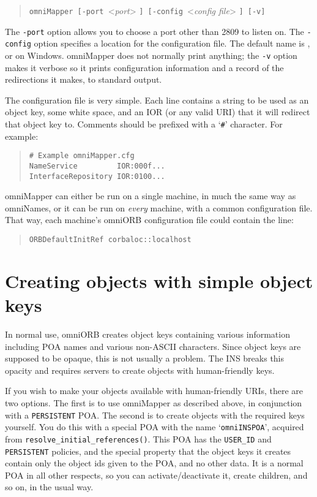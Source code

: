 \documentclass[11pt,oneside,a4paper]{book}
\newcommand{\code}[1]{\texttt{#1}}
\newcommand{\op}[1]{\texttt{#1()}}
\newcommand{\cmdline}[1]{\texttt{#1}}
\begin{document}
\begin{quote}
\cmdline{omniMapper [-port }<\textit{port}>%
\cmdline{] [-config }<\textit{config file}>%
\cmdline{] [-v]}
\end{quote}

\noindent The \cmdline{-port} option allows you to choose a port other
than 2809 to listen on. The \cmdline{-config} option specifies a
location for the configuration file. The default name is
, or  on
Windows. omniMapper does not normally print anything; the \cmdline{-v}
option makes it verbose so it prints configuration information and a
record of the redirections it makes, to standard output.

The configuration file is very simple. Each line contains a string to
be used as an object key, some white space, and an IOR (or any valid
URI) that it will redirect that object key to. Comments should be
prefixed with a `\texttt{\#}' character. For example:

\begin{quote}
\begin{verbatim}
# Example omniMapper.cfg
NameService         IOR:000f...
InterfaceRepository IOR:0100...
\end{verbatim}
\end{quote}

omniMapper can either be run on a single machine, in much the same way
as omniNames, or it can be run on \emph{every} machine, with a common
configuration file. That way, each machine's omniORB configuration
file could contain the line:

\begin{quote}
\begin{verbatim}
ORBDefaultInitRef corbaloc::localhost
\end{verbatim}
\end{quote}



\section{Creating objects with simple object keys}

In normal use, omniORB creates object keys containing various
information including POA names and various non-ASCII characters.
Since object keys are supposed to be opaque, this is not usually a
problem. The INS breaks this opacity and requires servers to create
objects with human-friendly keys.

If you wish to make your objects available with human-friendly URIs,
there are two options. The first is to use omniMapper as described
above, in conjunction with a \code{PERSISTENT} POA. The second is to
create objects with the required keys yourself. You do this with a
special POA with the name `\texttt{omniINSPOA}', acquired from
\op{resolve\_initial\_references}. This POA has the \code{USER\_ID}
and \code{PERSISTENT} policies, and the special property that the
object keys it creates contain only the object ids given to the POA,
and no other data. It is a normal POA in all other respects, so you
can activate/deactivate it, create children, and so on, in the usual
way.
\end{document}
